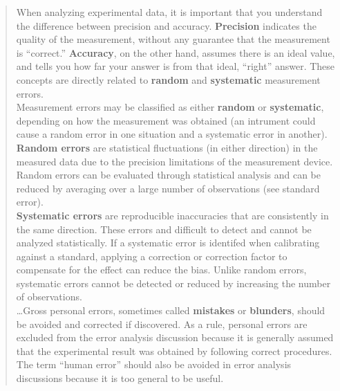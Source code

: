 \documentclass[12pt]{article}
\begin{document}
\begin{quote}
When analyzing experimental data, it is important that you understand the difference between precision and accuracy. 
\textbf{Precision} indicates the quality of the measurement, without any guarantee that the measurement is ``correct.''
\textbf{Accuracy}, on the other hand, assumes there is an ideal value, and tells you how far your answer is from that ideal, ``right'' answer. 
These concepts are directly related to \textbf{random} and \textbf{systematic} measurement errors.\\

\noindent Measurement errors may be classified as either \textbf{random} or \textbf{systematic}, depending on how the measurement was obtained (an intrument could cause a random error in one situation and a systematic error in another).\\

\noindent \textbf{Random errors} are statistical fluctuations (in either direction) in the measured data due to the precision limitations of the measurement device. Random errors can be evaluated through statistical analysis and can be reduced by averaging over a large number of observations (see standard error).\\

\noindent \textbf{Systematic errors} are reproducible inaccuracies that are consistently in the same direction.
These errors and difficult to detect and cannot be analyzed statistically.
If a systematic error is identifed when calibrating against a standard, applying a correction or correction factor to compensate for the effect can reduce the bias.
 Unlike random errors, systematic errors cannot be detected or reduced by increasing the number of observations.\\

\noindent \ldots  Gross personal errors, sometimes called \textbf{mistakes} or \textbf{blunders}, should be avoided and corrected if discovered.
As a rule, personal errors are excluded from the error analysis discussion because it is generally assumed that the experimental result was obtained by
following correct procedures.
The term ``human error'' should also be avoided in error analysis discussions because it is too general to be useful. 
\end{quote}
\end{document}
